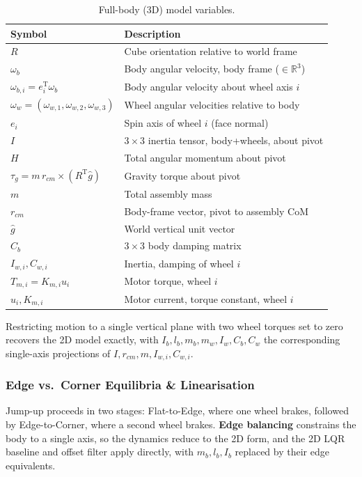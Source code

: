 \begin{table}[htbp]
\centering
\caption[Full-body (3D) model variables]{Full-body (3D) model variables.}
\label{tab:3d_vars}
\begin{tabular}{ll}
\toprule
Symbol & Description \\
\midrule
$R$ & Cube orientation relative to world frame \\
$\omega_b$ & Body angular velocity, body frame ($\in\mathbb{R}^3$) \\
$\omega_{b,i} = e_i^{\mathrm T}\omega_b$ & Body angular velocity about wheel axis $i$ \\
$\omega_w = (\omega_{w,1},\omega_{w,2},\omega_{w,3})$ & Wheel angular velocities relative to body \\
$e_i$ & Spin axis of wheel $i$ (face normal) \\
$I$ & $3\times3$ inertia tensor, body+wheels, about pivot \\
$H$ & Total angular momentum about pivot \\
$\tau_g = m\,r_{cm}\times(R^{\mathrm T}\hat g)$ & Gravity torque about pivot \\
$m$ & Total assembly mass \\
$r_{cm}$ & Body-frame vector, pivot to assembly CoM \\
$\hat g$ & World vertical unit vector \\
$C_b$ & $3\times3$ body damping matrix \\
$I_{w,i}, C_{w,i}$ & Inertia, damping of wheel $i$ \\
$T_{m,i} = K_{m,i}u_i$ & Motor torque, wheel $i$ \\
$u_i, K_{m,i}$ & Motor current, torque constant, wheel $i$ \\
\bottomrule
\end{tabular}
\end{table}

Restricting motion to a single vertical plane with two wheel torques set to
zero recovers the 2D model exactly, with $I_b, l_b, m_b, m_w, I_w,
C_b, C_w$ the corresponding single-axis projections of $I, r_{cm}, m, I_{w,i},
C_{w,i}$.


\subsubsection{Edge vs.\ Corner Equilibria \& Linearisation}

Jump-up proceeds in two stages: Flat-to-Edge, where one wheel brakes,
followed by Edge-to-Corner, where a second wheel brakes. \textbf{Edge
balancing} constrains the body to a single axis, so the dynamics reduce to
the 2D form, and the 2D LQR baseline and offset filter apply directly, with
$m_b, l_b, I_b$ replaced by their edge equivalents.

